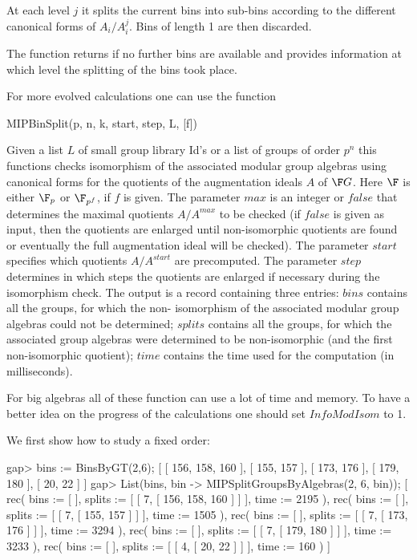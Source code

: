 At each level $j$ it splits the current bins into sub-bins according 
to the different canonical forms of $A_i/A_i^j$. Bins of length 1 are 
then discarded.

The function returns if no further bins are available and provides
information at which level the splitting of the bins took place.

For more evolved calculations one can use the function

\> MIPBinSplit(p, n, k, start, step, L, [f])

Given a list $L$ of small group library Id's or a list of groups of order $p^n$ this functions checks
isomorphism of the associated modular group algebras using canonical forms for the quotients of the
augmentation ideals $A$ of $\F G$. Here $\F$ is either $\F_p$ or $\F_{p^f}$, if $f$ is given.
The parameter $max$ is an integer or $false$ that determines the maximal
quotients $A/A^{max}$ to be checked (if $false$ is given as input, then the quotients are enlarged
until non-isomorphic quotients are found or eventually the full augmentation ideal will be checked).
The parameter $start$ specifies which quotients $A/A^{start}$ are precomputed. The parameter
$step$ determines in which steps the quotients are enlarged if necessary during the isomorphism check.
The output is a record containing three entries: $bins$ contains all the groups, for which the non-
isomorphism of the associated modular group algebras could not be determined; $splits$ contains all
the groups, for which the associated group algebras were determined to be non-isomorphic (and the
first non-isomorphic quotient); $time$ contains the time used for the computation (in milliseconds).

For big algebras all of these function can use a lot of time and memory. To have a
better idea on the progress of the calculations one should set $InfoModIsom$ to 1.

We first show how to study a fixed order:

\beginexample
gap> bins := BinsByGT(2,6);
[ [ 156, 158, 160 ], [ 155, 157 ], [ 173, 176 ], [ 179, 180 ], [ 20, 22 ] ]
gap> List(bins, bin -> MIPSplitGroupsByAlgebras(2, 6, bin));
[ rec( bins := [  ], splits := [ [ 7, [ 156, 158, 160 ] ] ], time := 2195 ), 
  rec( bins := [  ], splits := [ [ 7, [ 155, 157 ] ] ], time := 1505 ), 
  rec( bins := [  ], splits := [ [ 7, [ 173, 176 ] ] ], time := 3294 ), 
  rec( bins := [  ], splits := [ [ 7, [ 179, 180 ] ] ], time := 3233 ), 
  rec( bins := [  ], splits := [ [ 4, [ 20, 22 ] ] ], time := 160 ) ]
\endexample

